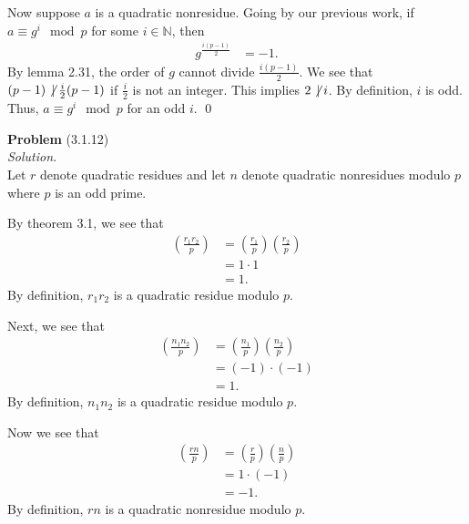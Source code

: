 \documentclass[12 pt]{amsart}
\begin{document}
  Now suppose $a$ is a quadratic nonresidue.
  Going by our previous work, if $a \equiv g^i \mod p$ for some
  $i \in \mathbb{N}$, then 
  \begin{align*}
    g^{\frac{i(p-1)}{2}} &= -1.
  \end{align*}
  By lemma 2.31, the order of $g$ cannot divide 
  $\frac{i(p-1)}{2}$.
  We see that $(p-1) \not \, \mid \frac{i}{2}(p-1)$
  if $\frac{i}{2}$ is not an integer. 
  This implies $2 \not \, \mid i$. 
  By definition, $i$ is odd. 
  Thus, $a \equiv g^i \mod p$ for an odd $i$.
  \qed
\vfill
\newpage



\phantom{\quad} \vfill
\noindent
\textbf{Problem} (3.1.12) \\[4ex]
\emph{Solution.} \\[2ex]
  Let $r$ denote quadratic residues and let
  $n$ denote quadratic nonresidues modulo $p$
  where $p$ is an odd prime.
  
  By theorem 3.1, we see that
  \begin{align*}
    \left( \frac{r_1 r_2}{p} \right)
    &=
      \left( \frac{r_1}{p} \right) 
      \left( \frac{r_2}{p} \right) \\
    &=
      1 \cdot 1 \\
    &= 
      1.
  \end{align*}
  By definition, $r_1 r_2$ is a quadratic residue modulo $p$.

  Next, we see that 
  \begin{align*}
    \left( \frac{n_1 n_2}{p} \right)
    &=
      \left( \frac{n_1}{p} \right) 
      \left( \frac{n_2}{p} \right) \\
    &=
      (-1) \cdot (-1) \\
    &= 
      1.
  \end{align*}
  By definition, $n_1 n_2$ is a quadratic residue modulo $p$.

  Now we see that 
  \begin{align*}
    \left( \frac{r n}{p} \right)
    &=
      \left( \frac{r}{p} \right) 
      \left( \frac{n}{p} \right) \\
    &=
      1 \cdot (-1) \\
    &= 
      -1.
  \end{align*}
  By definition, $r n$ is a quadratic nonresidue modulo $p$.
\end{document}
